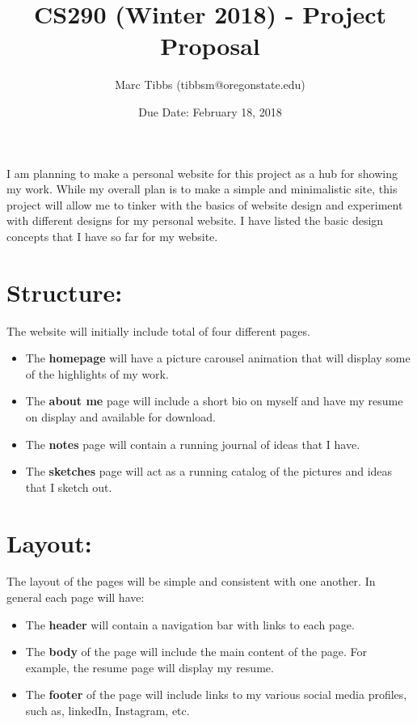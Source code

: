 \documentclass{article}
\title{CS290 (Winter 2018) - Project Proposal}
\author{Marc Tibbs (tibbsm@oregonstate.edu)}
\date{Due Date: February 18, 2018}
\begin{document}
\maketitle

I am planning to make a personal website for this project as a hub for showing my work. While my overall plan is to make a simple and minimalistic site, this project will allow me to tinker with the basics of website design and experiment with different designs for my personal website. I have listed the basic design concepts that I have so far for my website. 

\section*{Structure:}

The website will initially include total of four different pages. 

\begin{itemize}
    \item The \textbf{homepage} will have a picture carousel animation that will display some of the highlights of my work. 
    \item The \textbf{about me} page will include a short bio on myself and have my resume on display and available for download. 
    \item The \textbf{notes} page will contain a running journal of ideas that I have. 
    \item The \textbf{sketches} page will act as a running catalog of the pictures and ideas that I sketch out. 
\end{itemize}

\section*{Layout:}

The layout of the pages will be simple and consistent with one another. In general each page will have:
\begin{itemize}
    \item The \textbf{header} will contain a navigation bar with links to each page. 
    \item The \textbf{body} of the page will include the main content of the page. For example, the resume page will display my resume. 
    \item The \textbf{footer} of the page will include links to my various social media profiles, such as, linkedIn, Instagram, etc.
\end{itemize}
\end{document}
